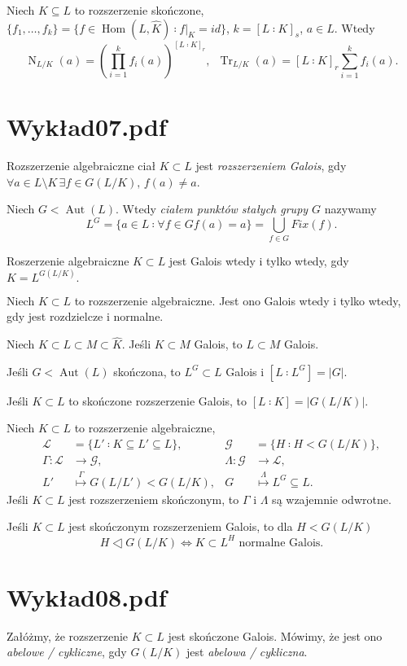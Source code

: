 \documentclass[a4paper, 12pt]{article}
\DeclareMathOperator{\Hom}{Hom}
\DeclareMathOperator{\Aut}{Aut}
\DeclareMathOperator{\Tr}{Tr}
\DeclareMathOperator{\Norm}{N}
\newcommand{\modulus}[1]{\left| #1 \right|}
\newcommand{\abs}{\modulus}
\newcommand{\+}{\enspace}
\begin{document}
Niech $K ⊆ L$ to rozszerzenie skończone,
$\{ f_1, …, f_k \} = \{ f ∈ \Hom(L, \hat{K}) ∶ f|_K = id \}$,
$k=[L∶K]_s$, $a ∈ L$.
Wtedy
$$\Norm_{L/K}(a) = \left(∏_{i=1}^k f_i(a)\right)^{[L∶K]_r},
\+\Tr_{L/K}(a) = [L∶K]_r ∑_{i=1}^k f_i(a).$$


\section*{Wykład07.pdf}
Rozszerzenie algebraiczne ciał $K ⊂ L$ jest
\textit{rozszerzeniem Galois}, gdy
$∀a∈L\setminus K\, ∃f∈G(L/K),\, f(a)≠a$.

Niech $G<\Aut(L)$. Wtedy \textit{ciałem punktów stałych grupy $G$} nazywamy
$$L^G = \{ a∈L ∶ ∀f∈G f(a)=a \} = \bigcup_{f∈G} Fix(f).$$

Roszerzenie algebraiczne $K⊂L$
jest Galois wtedy i tylko wtedy, gdy
$K = L^{G(L/K)}.$


Niech $K⊂L$ to rozszerzenie algebraiczne.
Jest ono Galois wtedy i tylko wtedy, gdy
jest rozdzielcze i normalne.

Niech $K ⊂ L ⊂ M ⊂ \hat{K}$.
Jeśli $K ⊂ M$ Galois, to $L ⊂ M$ Galois.

Jeśli $G < \Aut(L)$ skończona, to $L^G ⊂ L$ Galois i $[L ∶ L^G] = |G|$.

Jeśli $K ⊂ L$ to skończone rozszerzenie Galois,
to $[L ∶ K] = \abs{G(L/K)}.$

Niech $K⊂L$ to rozszerzenie algebraiczne,
\begin{align*}
	\mathcal{L} &= \{L' ∶ K ⊆ L' ⊆ L \}, & \mathcal{G} &= \{ H ∶ H < G(L/K) \}, \\
	Γ : \mathcal{L} &\rightarrow \mathcal{G}, & Λ : \mathcal{G} &\rightarrow \mathcal{L}, \\
	L' &\stackrel{Γ}{↦} G(L/L') < G(L/K), &  G &\stackrel{Λ}{↦} L^G ⊆ L.
\end{align*} %
Jeśli $K⊂L$ jest rozszerzeniem skończonym, to $Γ$ i $Λ$ są wzajemnie odwrotne.

Jeśli $K⊂L$ jest skończonym rozszerzeniem Galois, to
dla $H<G(L/K)$
$$H◁G(L/K) ⇔ K ⊂ L^H \text{ normalne Galois}.$$

\section*{Wykład08.pdf}
Załóżmy, że rozszerzenie $K⊂L$ jest skończone Galois.
Mówimy, że jest ono \textit{abelowe / cykliczne}, gdy $G(L/K)$ jest
\textit{abelowa / cykliczna}.
\end{document}
